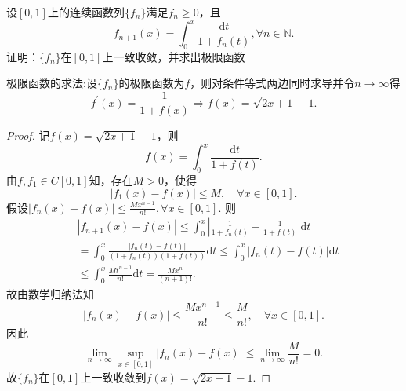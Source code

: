 \documentclass[../../main.tex]{subfiles}
\begin{document}
\begin{example}
设\( [0,1] \)上的连续函数列\( \{f_n\} \)满足\( f_n \geqslant 0 \)，且
\[
f_{n+1}(x) = \int_0^x \frac{\mathrm{d}t}{1 + f_n(t)}, \forall n \in \mathbb{N}.
\]
证明：\( \{f_n\} \)在\( [0,1] \)上一致收敛，并求出极限函数
\end{example}
\begin{note}
极限函数的求法:设\( \{f_n\} \)的极限函数为\( f \)，则对条件等式两边同时求导并令\( n\rightarrow \infty \)得
\[
f^\prime(x) = \frac{1}{1 + f(x)} \Longrightarrow f(x) = \sqrt{2x + 1} - 1.
\]
\end{note}
\begin{proof}
记\( f(x) = \sqrt{2x + 1} - 1 \)，则
\[
f(x) = \int_0^x{\frac{\mathrm{d}t}{1 + f(t)}}.
\]
由\( f,f_1 \in C[0,1] \)知，存在\( M > 0 \)，使得
\[
|f_1(x) - f(x)| \leqslant M,\quad \forall x \in [0,1].
\]
假设\( |f_n(x) - f(x)| \leqslant \frac{Mx^{n - 1}}{n!},\forall x \in [0,1] \). 则
\begin{align*}
&|f_{n + 1}(x) - f(x)| \leqslant \int_0^x{\left| \frac{1}{1 + f_n(t)} - \frac{1}{1 + f(t)} \right|}\mathrm{d}t \\
&= \int_0^x{\frac{|f_n(t) - f(t)|}{(1 + f_n(t))(1 + f(t))}\mathrm{d}t} \leqslant \int_0^x{|f_n(t) - f(t)|\mathrm{d}t} \\
&\leqslant \int_0^x{\frac{Mt^{n - 1}}{n!}\mathrm{d}t} = \frac{Mx^n}{(n + 1)!}.
\end{align*}
故由数学归纳法知
\[
|f_n(x) - f(x)| \leqslant \frac{Mx^{n - 1}}{n!} \leqslant \frac{M}{n!},\quad \forall x \in [0,1].
\]
因此
\[
\lim_{n \to \infty} \sup_{x \in [0,1]} |f_n(x) - f(x)| \leqslant \lim_{n \to \infty} \frac{M}{n!} = 0.
\]
故\( \{f_n\} \)在\( [0,1] \)上一致收敛到\( f(x) = \sqrt{2x + 1} - 1 \).

\end{proof}
\end{document}
